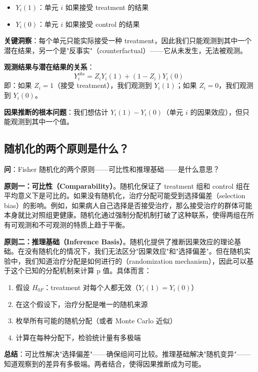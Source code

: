 \begin{itemize}
  \item $Y_i(1)$：单元 $i$ 如果接受 treatment 的结果
  \item $Y_i(0)$：单元 $i$ 如果接受 control 的结果
\end{itemize}

\textbf{关键洞察}：每个单元只能实际接受一种 treatment，因此我们只能观测到其中一个潜在结果，另一个是"反事实"（counterfactual）——它从未发生，无法被观测。

\textbf{观测结果与潜在结果的关系}：
\[
Y_i^{obs} = Z_i Y_i(1) + (1 - Z_i) Y_i(0)
\]
即：如果 $Z_i=1$（接受 treatment），我们观测到 $Y_i(1)$；如果 $Z_i=0$，我们观测到 $Y_i(0)$。

\textbf{因果推断的根本问题}：我们想估计 $Y_i(1) - Y_i(0)$（单元 $i$ 的因果效应），但只能观测到其中一个值。

\subsection{随机化的两个原则是什么？}\label{sec:qa-randomization-principles}

\textbf{问}：Fisher 随机化的两个原则——可比性和推理基础——是什么意思？

\textbf{原则一：可比性（Comparability）}。随机化保证了 treatment 组和 control 组在平均意义下是可比的。如果没有随机化，治疗分配可能受到选择偏差（selection bias）的影响。例如，如果病人自己选择是否接受治疗，那么接受治疗的群体可能本身就比对照组更健康。随机化通过强制分配机制打破了这种联系，使得两组在所有可观测和不可观测的特质上趋于平衡。

\textbf{原则二：推理基础（Inference Basis）}。随机化提供了推断因果效应的理论基础。在没有随机化的情况下，我们无法区分"因果效应"和"选择偏差"。但在随机实验中，我们知道治疗分配是如何进行的（randomization mechanism），因此可以基于这个已知的分配机制来计算 p 值。具体而言：

\begin{enumerate}
  \item 假设 $H_{0F}$：treatment 对每个人都无效（$Y_i(1) = Y_i(0)$）
  \item 在这个假设下，治疗分配是唯一的随机来源
  \item 枚举所有可能的随机分配（或者 Monte Carlo 近似）
  \item 计算在每种分配下，检验统计量有多极端
\end{enumerate}

\textbf{总结}：可比性解决"选择偏差"——确保组间可比较。推理基础解决"随机变异"——知道观察到的差异有多极端。两者结合，使得因果推断成为可能。

